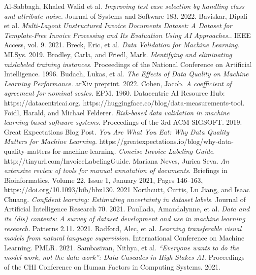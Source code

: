 \documentclass[twocolumn]{article}
\begin{document}

\begin{thebibliography}{10}
\footnotesize
{} Al-Sabbagh, Khaled Walid et al. {\em Improving test case selection by handling class and attribute noise.} Journal of Systems and Software 183. 2022.
 Baviskar, Dipali et al. {\em Multi-Layout Unstructured Invoice Documents Dataset: A Dataset for Template-Free Invoice Processing and Its Evaluation Using AI Approaches.}. IEEE Access, vol. 9. 2021.
 Breck, Eric, et al. {\em Data Validation for Machine Learning.} MLSys. 2019.
 Brodley, Carla, and Friedl, Mark. {\em Identifying and eliminating mislabeled training instances.} Proceedings of the National Conference on Artificial Intelligence. 1996.
 Budach, Lukas, et al. {\em The Effects of Data Quality on Machine Learning Performance.} arXiv preprint. 2022.
 Cohen, Jacob. {\em A coefficient of agreement for nominal scales.} EPM. 1960.
 Datacentric AI Resource Hub: https://datacentricai.org. 
 https://huggingface.co/blog/data-measurements-tool. 
 Foidl, Harald, and Michael Felderer. {\em Risk-based data validation in machine learning-based software systems.} Proceedings of the 3rd ACM SIGSOFT. 2019.
 Great Expectations Blog Post. {\em You Are What You Eat: Why Data Quality Matters for Machine Learning.} https://greatexpectations.io/blog/why-data-quality-matters-for-machine-learning. 
 {\em Concise Invoice Labeling Guide}. http://tinyurl.com/InvoiceLabelingGuide. 
 Mariana Neves, Jurica Seva. {\em An extensive review of tools for manual annotation of documents.} Briefings in Bioinformatics, Volume 22, Issue 1, January 2021, Pages 146–163, https://doi.org/10.1093/bib/bbz130. 2021
 Northcutt, Curtis, Lu Jiang, and Isaac Chuang. {\em Confident learning: Estimating uncertainty in dataset labels.} Journal of Artificial Intelligence Research 70. 2021.
 Paullada, Amandalynne, et al. {\em Data and its (dis) contents: A survey of dataset development and use in machine learning research.} Patterns 2.11. 2021.
 Radford, Alec, et al. {\em Learning transferable visual models from natural language supervision.} International Conference on Machine Learning. PMLR. 2021.
 Sambasivan, Nithya, et al. {\em ``Everyone wants to do the model work, not the data work'': Data Cascades in High-Stakes AI.} Proceedings of the CHI Conference on Human Factors in Computing Systems. 2021.

\end{thebibliography}
\end{document}
